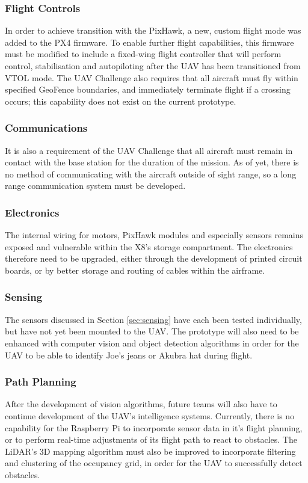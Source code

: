 \subsubsection*{Flight Controls}
In order to achieve transition with the PixHawk, a new, custom flight mode was added to the PX4 firmware. To enable further flight capabilities, this firmware must be modified to include a fixed-wing flight controller that will perform control, stabilisation and autopiloting after the UAV has been transitioned from VTOL mode. The UAV Challenge also requires that all aircraft must fly within specified GeoFence boundaries, and immediately terminate flight if a crossing occurs; this capability does not exist on the current prototype.

\subsubsection*{Communications}
It is also a requirement of the UAV Challenge that all aircraft must remain in contact with the base station for the duration of the mission. As of yet, there is no method of communicating with the aircraft outside of sight range, so a long range communication system must be developed. 

\subsubsection*{Electronics}
The internal wiring for motors, PixHawk modules and especially sensors remains exposed and vulnerable within the X8's storage compartment. The electronics therefore need to be upgraded, either through the development of printed circuit boards, or by better storage and routing of cables within the airframe.

\subsubsection*{Sensing}
The sensors discussed in Section \ref{sec:sensing} have each been tested individually, but have not yet been mounted to the UAV. The prototype will also need to be enhanced with computer vision and object detection algorithms in order for the UAV to be able to identify Joe's jeans or Akubra hat during flight.

\subsubsection*{Path Planning}
After the development of vision algorithms, future teams will also have to continue development of the UAV's intelligence systems. Currently, there is no capability for the Raspberry Pi to incorporate sensor data in it's flight planning, or to perform real-time adjustments of its flight path to react to obstacles. The LiDAR's 3D mapping algorithm must also be improved to incorporate filtering and clustering of the occupancy grid, in order for the UAV to successfully detect obstacles.